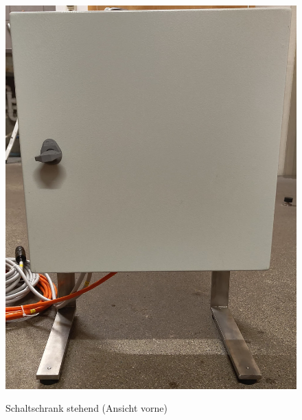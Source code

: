 \begin{figure}[H]
	\begin{minipage}[b]{.4\linewidth}
		\includegraphics[width=\linewidth]{../ref/Schaltschrank_stehend_vorne.jpeg}
		\label{fig:schaltschrankstehendvorne}
		\caption{Schaltschrank stehend (Ansicht vorne)}
	\end{minipage}
	\hspace{.1\linewidth}%
	\begin{minipage}[b]{.4\linewidth} %

\end{minipage}
\end{figure}
